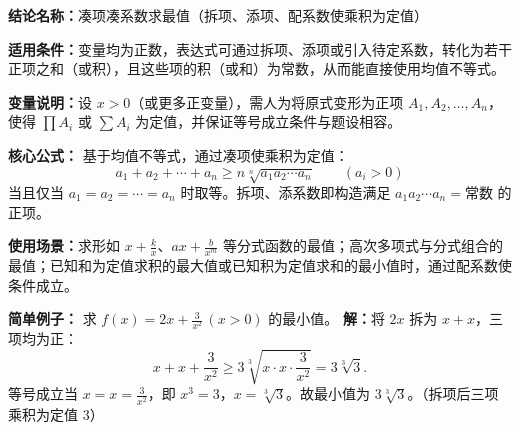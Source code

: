 \textbf{结论名称：}凑项凑系数求最值（拆项、添项、配系数使乘积为定值）

\textbf{适用条件：}变量均为正数，表达式可通过拆项、添项或引入待定系数，转化为若干正项之和（或积），且这些项的积（或和）为常数，从而能直接使用均值不等式。

\textbf{变量说明：}设 \(x>0\)（或更多正变量），需人为将原式变形为正项 \(A_1,A_2,\dots,A_n\)，使得 \(\prod A_i\) 或 \(\sum A_i\) 为定值，并保证等号成立条件与题设相容。

\textbf{核心公式：}
基于均值不等式，通过凑项使乘积为定值：
\[
\boxed{a_1 + a_2 + \cdots + a_n \ge n\sqrt[n]{a_1 a_2 \cdots a_n}\qquad (a_i>0)}
\]
当且仅当 \(a_1 = a_2 = \cdots = a_n\) 时取等。拆项、添系数即构造满足 \(a_1a_2\cdots a_n = \text{常数}\) 的正项。

\textbf{使用场景：}求形如 \(x + \frac{k}{x}\)、\(ax + \frac{b}{x^m}\) 等分式函数的最值；高次多项式与分式组合的最值；已知和为定值求积的最大值或已知积为定值求和的最小值时，通过配系数使条件成立。

\textbf{简单例子：}
求 \(f(x)=2x+\frac{3}{x^2}\,(x>0)\) 的最小值。
\textbf{解：}将 \(2x\) 拆为 \(x+x\)，三项均为正：
\[
x + x + \frac{3}{x^2} \ge 3\sqrt[3]{x \cdot x \cdot \frac{3}{x^2}} = 3\sqrt[3]{3}.
\]
等号成立当 \(x = x = \frac{3}{x^2}\)，即 \(x^3 = 3\)，\(x = \sqrt[3]{3}\)。故最小值为 \(3\sqrt[3]{3}\)。（拆项后三项乘积为定值 \(3\)）